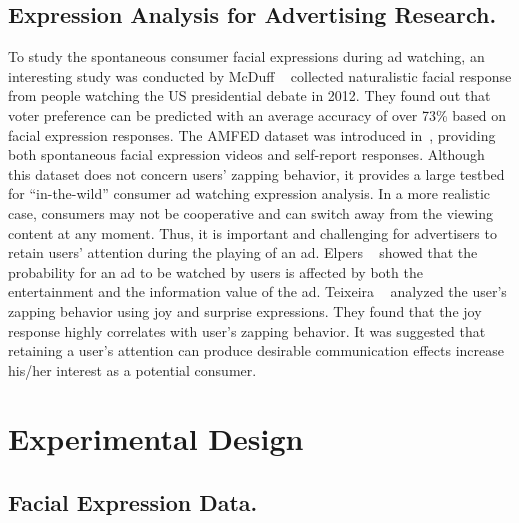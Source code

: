 \documentclass[twoside,leqno,twocolumn]{article}
\begin{document}
\subsection{Expression Analysis for Advertising Research.}

To study the spontaneous consumer facial expressions during ad watching, an interesting study was conducted by McDuff \etal~\cite{McDuff13} collected naturalistic facial response from people watching the US presidential debate in 2012. They found out that voter preference can be predicted with an average accuracy of over 73\% based on facial expression responses. The AMFED dataset was introduced in~\cite{amfed}, providing both spontaneous facial expression videos and self-report responses. Although this dataset does not concern users' zapping behavior, it provides a large testbed for ``in-the-wild'' consumer ad watching expression analysis. In a more realistic case, consumers may not be cooperative and can switch away from the viewing content at any moment. Thus, it is important and challenging for advertisers to retain users' attention during the playing of an ad. Elpers \etal~\cite{Elpers03} showed that the probability for an ad to be watched by users is affected by both the entertainment and the information value of the ad. Teixeira \etal~\cite{Teixeira12} analyzed the user's zapping behavior using joy and surprise expressions. They found that the joy response highly correlates with user's zapping behavior. It was suggested that retaining a user's attention can produce desirable communication effects increase his/her interest as a potential consumer. 



\section{Experimental Design}

\subsection{Facial Expression Data.}
\end{document}
